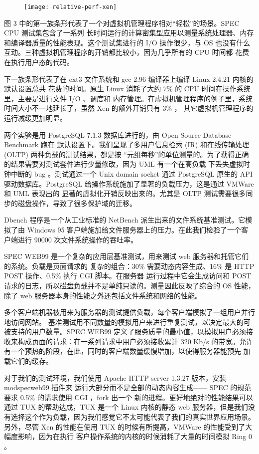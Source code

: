 \begin{figure}[h]
    \centering
    \texttt{[image: relative-perf-xen]}
\end{figure}

图 3 中的第一族条形代表了一个对虚拟机管理程序相对“轻松”的场景。SPEC CPU 测试集包含了一系列
长时间运行的计算密集型应用以测量系统处理器、内存和编译器质量的性能表现。这个测试集进行的 I/O
操作很少，与 OS 也没有什么互动。三种虚拟机管理程序的开销都比较小，因为几乎所有的 CPU 时间都
花费在执行用户态的代码。

下一族条形代表了在 ext3 文件系统和 gcc 2.96 编译器上编译 Linux 2.4.21 内核的默认设置总共
花费的时间。原生 Linux 消耗了大约 7\% 的 CPU 时间在操作系统里，主要是进行文件 I/O 、调度和
内存管理。在虚拟机管理程序的例子里，系统时间大小不一地延长了，虽然 Xen 的额外开销只有 3\% ，
其它虚拟机管理程序的运行减缓更加明显。

两个实验是用 PostgreSQL 7.1.3 数据库进行的，由 Open Source Database Benchmark 跑在
默认设置下。我们呈现了多用户信息检索 (IR) 和在线传输处理 (OLTP) 两种负载的测试结果，都是按
“元组每秒”的单位测量的。为了获得正确的结果需要对测试套件进行少量修改，因为 UML 有一个在高负载
下丢失虚拟时钟中断的 bug 。测试通过一个 Unix domain socket 通过 PostgreSQL 原生的 API
驱动数据库。PostgreSQL 给操作系统施加了显著的负载压力，这是通过 VMWare 和 UML 表现出的
显著的虚拟化开销反映出来的。尤其是 OLTP 测试需要很多同步的磁盘操作，导致了很多保护域的迁移。

Dbench 程序是一个从工业标准的 NetBench 派生出来的文件系统基准测试。它模拟了由 Windows 95
客户端施加给文件服务器上的压力。在此我们检验了一个客户端进行 90000 次文件系统操作的吞吐率。

SPEC WEB99 是一个复杂的应用层基准测试，用来测试 web 服务器和托管它们的系统。负载是页面请求的
复杂的组合：30\% 需要动态内容生成、16\% 是 HTTP POST 操作、0.5\% 执行 CGI 脚本。在服务器
运行过程中它会生成访问和 POST 请求的日志，所以磁盘负载并不是单纯只读的。测量因此反映了综合的
OS 性能，除了 web 服务器本身的性能之外还包括文件系统和网络的性能。

多个客户端机器被用来为服务器的测试提供负载，每个客户端模拟了一组用户并行地访问网站。
基准测试用不同数量的模拟用户来进行重复测试，以决定最大的可被支持的用户数量。SPEC WEB99
定义了服务质量的最小值，以模拟用户必须接收来构成页面的请求：在一系列请求中用户必须接收累计
320 Kb/s 的带宽。允许有一个预热的阶段，在此，同时的客户端数量缓慢增加，以使得服务器能预先
加载它们的缓存。

对于我们的测试环境，我们使用 Apache HTTP server 1.3.27 版本，安装 modspecweb99 插件来
运行大部分而不是全部的动态内容生成—— SPEC 的规范要求 0.5\% 的请求使用 CGI ，fork 出一个
新的进程。更好地绝对的性能结果可以通过 TUX 的帮助达成，TUX 是一个 Linux 内核的静态 web
服务器，但是我们没有选择这个作为负载，因为我们感觉它不太可能代表了我们的真实世界应用场景。
另外，尽管 Xen 的性能在使用 TUX 的时候有所提高，VMWare 的性能受到了大幅度影响，因为在执行
客户操作系统的内核的时候消耗了大量的时间模拟 Ring 0 。

